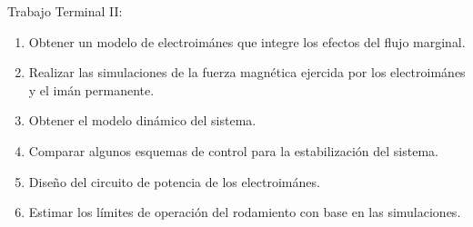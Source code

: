 Trabajo Terminal II:
\begin{enumerate}
\addtolength{\itemsep}{0pt}
\item Obtener un modelo de electroimánes que integre los efectos del flujo marginal.
\item Realizar las simulaciones de la fuerza magnética ejercida por los electroimánes y el imán permanente.
\item Obtener el modelo dinámico del sistema.  
\item Comparar algunos esquemas de control para la estabilización del sistema.
\item Diseño del circuito de potencia de los electroimánes. 
\item Estimar los límites de operación del rodamiento con base en las simulaciones.
\end{enumerate}
